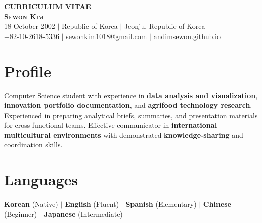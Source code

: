 \documentclass[a4paper,11pt]{article}
\begin{document}
\begin{center}
  {\LARGE\bfseries CURRICULUM VITAE}\\[8pt]
  {\huge\bfseries\scshape Sewon Kim}\\[7pt]
  {\small
    18 October 2002
    \enspace$\vert$\enspace
    Republic of Korea
    \enspace$\vert$\enspace
    Jeonju, Republic of Korea
  }\\[3pt]
  {\small
    +82-10-2618-5336
    \enspace$\vert$\enspace
    \href{mailto:sewonkim1018@gmail.com}{sewonkim1018@gmail.com}
    \enspace$\vert$\enspace
    \href{https://andimsewon.github.io}{andimsewon.github.io}
  }
\end{center}


\section{Profile}
\small
Computer Science student with experience in \textbf{data analysis and visualization}, \textbf{innovation portfolio documentation}, and \textbf{agrifood technology research}. Experienced in preparing analytical briefs, summaries, and presentation materials for cross-functional teams. Effective communicator in \textbf{international multicultural environments} with demonstrated \textbf{knowledge-sharing} and coordination skills.


\section{Languages}
\vspace{2pt}
{\small
\textbf{Korean} (Native) \enspace$\vert$\enspace
\textbf{English} (Fluent) \enspace$\vert$\enspace
\textbf{Spanish} (Elementary) \enspace$\vert$\enspace
\textbf{Chinese} (Beginner) \enspace$\vert$\enspace
\textbf{Japanese} (Intermediate)
}


\end{document}
